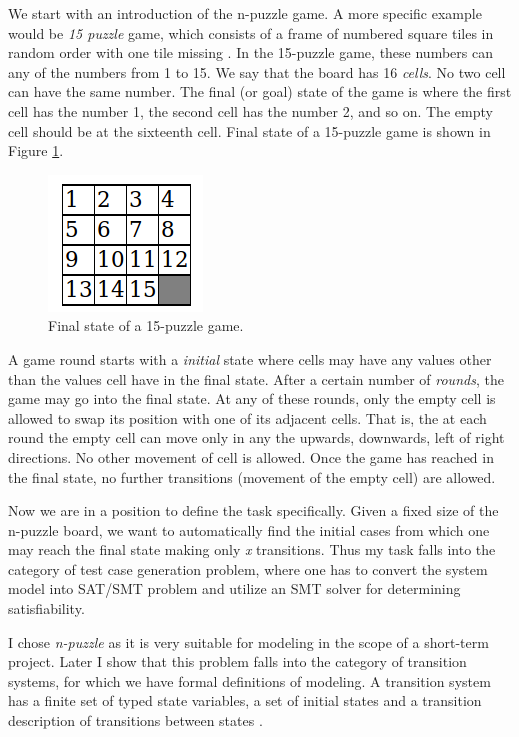 \documentclass{sig-alternate-05-2015}
\begin{document}
We start with an introduction of the n-puzzle game. A more specific 
example would be \textit{15 puzzle} game, which 
consists of a frame of numbered square tiles in random order 
with one tile missing \cite{wiki:npuzzle}. In the 15-puzzle game, these
numbers can any of the numbers from 1 to 15. We say that the board 
has 16 \textit{cells}. No two cell can have the same number. The final
(or goal) state of the game is where the first cell has the number 1,
the second cell has the number 2, and so on. The empty cell should
be at the sixteenth cell. Final state of a 15-puzzle game is shown
in Figure \ref{fig:npfinal}. 

\begin{figure}
\centering
\includegraphics{npfinal}
\caption{Final state of a 15-puzzle game.}
\label{fig:npfinal}
\end{figure}

A game round starts with a \textit{initial} state where cells may have
any values other than the values cell have in the final state. 
After a certain number of \textit{rounds}, the game may go into 
the final state. At any of these rounds, only the empty cell 
is allowed to swap its position with one of its adjacent cells. 
That is, the at each round the empty cell can move only in any the  
upwards, downwards, left of right directions. No other movement of 
cell is allowed. Once the game has reached in the final state, no 
further transitions (movement of the empty cell) are allowed.

Now we are in a position to define the task specifically. Given 
a fixed size of the n-puzzle board, we want to automatically find 
the initial cases from which one may reach the final state making only
\textit{x} transitions. Thus my task falls into the category of test case 
generation problem, where one has to convert the system model into SAT/SMT 
problem and utilize an SMT solver for determining satisfiability.

I chose \textit{n-puzzle} as it is very suitable for modeling in the scope of 
a short-term project. Later I show that this problem falls into the category 
of transition systems, for which we have formal definitions of modeling. A 
transition system has a finite set of typed state variables, a set of initial 
states and a transition description of transitions between states \cite{Alur:CPS}. 
\end{document}
